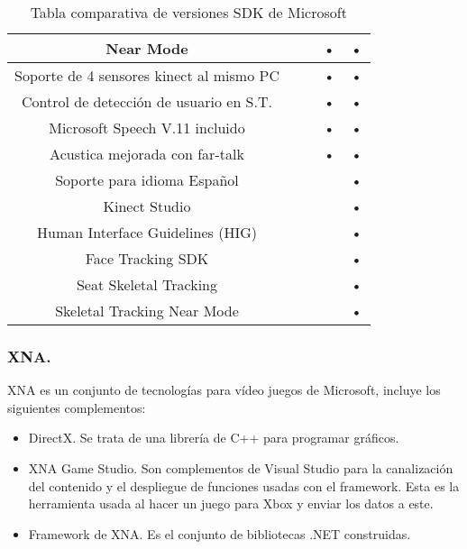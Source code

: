 \documentclass[11pt,a4paper]{article}
\begin{document}
\begin{table}[h]
\begin{tabular}{||c||c||c||c||c||}
		\hline Near Mode                                &        &        & •         & •           \\
		\hline Soporte de 4 sensores kinect al mismo PC &        &        & •         & •           \\ 
		\hline Control de detección de usuario en S.T.  &        &        & •         & •           \\ 
		\hline Microsoft Speech V.11 incluido           &        &        & •         & •           \\  
		\hline Acustica mejorada con far-talk           &        &        & •         & •           \\  
		\hline Soporte para idioma Español              &        &        &           & •           \\ 
		\hline Kinect Studio                            &        &        &           & •           \\ 
		\hline Human Interface Guidelines (HIG)         &        &        &           & •           \\ 
		\hline Face Tracking SDK                        &        &        &           & •           \\ 
		\hline Seat Skeletal Tracking                   &        &        &           & •           \\ 
		\hline Skeletal Tracking Near Mode              &        &        &           & •           \\ 
		\hline 
	\end{tabular} 
	\caption{Tabla comparativa de versiones SDK de Microsoft}
	\label{tabla_comparativa}
\end{table}
\subsubsection{XNA.}
XNA es un conjunto de tecnologías para vídeo juegos de Microsoft, incluye los siguientes complementos: 
\begin{itemize}
	\item DirectX. Se trata de una librería de C++ para programar gráficos.
	\item XNA Game Studio. Son complementos de Visual Studio para la canalización del contenido y el despliegue de funciones usadas con el framework. Esta es la herramienta usada al hacer un juego para Xbox y enviar los datos a este.
	\item Framework de XNA. Es el conjunto de bibliotecas .NET construidas.
\end{itemize}
\end{document}
